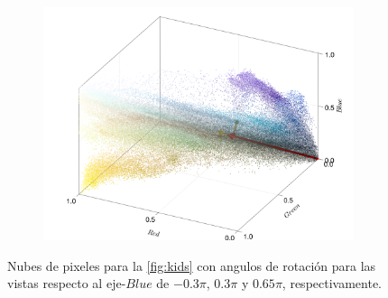 \begin{figure}[ht!]
\begin{subfigure}[c]{0.3\textwidth}
        \centering
        \includegraphics[scale=0.09]{../figures/pixel_cloud_kids_3}
    \end{subfigure}
    \caption{Nubes de pixeles para la \cref{fig:kids} con angulos de rotación para las vistas respecto al eje-$Blue$ de $-0.3\pi$, $0.3\pi$ y $0.65\pi$, respectivamente.}
    \label{fig:nube-pixeles-kids}
\end{figure}

